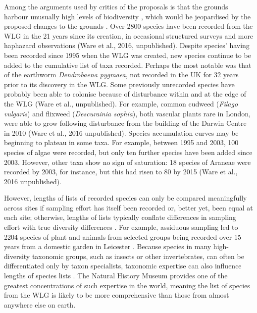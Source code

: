 Among the arguments used by critics of the proposals is that the grounds harbour unusually high levels of biodiversity \citep{changepetition:2015wg}, which would be jeopardised by the proposed changes to the grounds \citep{avery:2015wg}. Over 2800 species have been recorded from the WLG in the 21 years since its creation, in occasional structured surveys and more haphazard observations (Ware et al., 2016, unpublished). Despite species' having been recorded since 1995 when the WLG was created, new species continue to be added to the cumulative list of taxa recorded. Perhaps the most notable was that of the earthworm \textit{Dendrobaena pygmaea}, not recorded in the UK for 32 years prior to its discovery in the WLG. Some previously unrecorded species have probably been able to colonise because of disturbance within and at the edge of the WLG (Ware et al., unpublished). For example, common cudweed (\textit{Filago vulgaris}) and flixweed (\textit{Descurainia sophia}), both vascular plants rare in London, were able to grow following disturbance from the building of the Darwin Centre in 2010 (Ware et al., 2016 unpublished). Species accumulation curves may be beginning to plateau in some taxa. For example, between 1995 and 2003, 100 species of algae were recorded, but only ten further species have been added since 2003. However, other taxa show no sign of saturation: 18 species of Araneae were recorded by 2003, for instance, but this had risen to 80 by 2015 (Ware et al., 2016 unpublished).

However, lengths of lists of recorded species can only be compared meaningfully across sites if sampling effort has itself been recorded or, better yet, been equal at each site; otherwise, lengths of lists typically conflate differences in sampling effort with true diversity differences \citep{Gotelli:2001el,Crawley:2005flora}. For example, assiduous sampling led to 2204 species of plant and animals from selected groups being recorded over 15 years from a domestic garden in Leicester \citep{Owen:1991ecology}. Because species in many high-diversity taxonomic groups, such as insects or other invertebrates, can often be differentiated only by taxon specialists, taxonomic expertise can also influence lengths of species lists \citep{Crawley:2005flora}. The Natural History Museum provides one of the greatest concentrations of such expertise in the world, meaning the list of species from the WLG is likely to be more comprehensive than those from almost anywhere else on earth.

